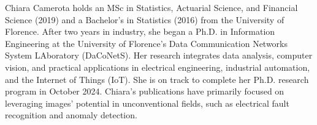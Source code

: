 
\begin{cvparagraph}

Chiara Camerota holds an MSc in Statistics, Actuarial Science, and Financial Science (2019) and a Bachelor's in Statistics (2016) from the University of Florence. After two years in industry, she began a Ph.D. in Information Engineering at the University of Florence's Data Communication Networks System LAboratory (DaCoNetS). Her research integrates data analysis, computer vision, and practical applications in electrical engineering, industrial automation, and the Internet of Things (IoT).  
She is on track to complete her Ph.D. research program in October 2024. Chiara's publications have primarily focused on leveraging images' potential in unconventional fields, such as electrical fault recognition and anomaly detection. 

\end{cvparagraph}